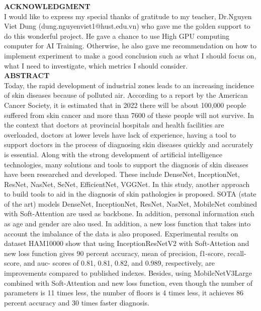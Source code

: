 
\textbf{ACKNOWLEDGMENT} \\ 
I would like to express my special thanks of gratitude to my teacher, Dr.Nguyen Viet Dung (dung.nguyenviet1@hust.edu.vn) who gave me the golden support to do this wonderful project. He gave a chance to use High GPU computing computer for AI Training. Otherwise, he also gave me recommendation on how to implement experiment to make a good conclusion such as what I should focus on, what I need to investigate, which metrics I should consider.\\

\textbf{ABSTRACT} \\
Today, the rapid development of industrial zones leads to an increasing incidence of skin diseases because of polluted air. According to a report by the American Cancer Society, it is estimated that in 2022 there will be about 100,000 people suffered from skin cancer and more than 7600 of these people will not survive. In the context that doctors at provincial hospitals and health facilities are overloaded, doctors at lower levels have lack of experience, having a tool to support doctors in the process of diagnosing skin diseases quickly and accurately is essential. Along with the strong development of artificial intelligence technologies, many solutions and tools to support the diagnosis of skin diseases have been researched and developed. These include DenseNet, InceptionNet, ResNet, NasNet, SeNet, EfficientNet, VGGNet. In this study, another approach to build tools to aid in the diagnosis of skin pathologies is proposed. SOTA (state of the art) models DenseNet, InceptionNet, ResNet, NasNet, MobileNet combined with Soft-Attention are used as backbone. In addition, personal information such as age and gender are also used. In addition, a new loss function that takes into account the imbalance of the data is also proposed. Experimental results on dataset HAM10000 show that using InceptionResNetV2 with Soft-Attetion and new loss function gives 90 percent accuracy, mean of precision, f1-score, recall-score, and auc- scores of 0.81, 0.81, 0.82, and 0.989, respectively, are improvements compared to published indexes. Besides, using MobileNetV3Large combined with Soft-Attention and new loss function, even though the number of parameters is 11 times less, the number of floors is 4 times less, it achieves 86 percent accuracy and 30 times faster diagnosis.\\
  
